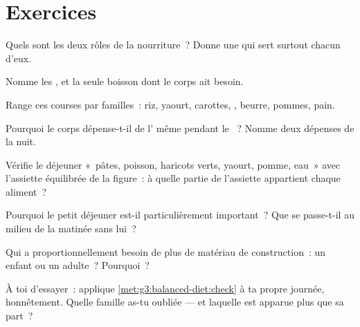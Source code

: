 \section{Exercices}

\begin{exercise}[$\star$]\label{exo:g3:balanced-diet:1}
Quels sont les deux rôles de la nourriture~? Donne une  qui sert surtout chacun d'eux.
\end{exercise}

\begin{exercise}[$\star$]\label{exo:g3:balanced-diet:2}
Nomme les , et la seule boisson dont le corps ait
besoin.
\end{exercise}

\begin{exercise}[$\star$]\label{exo:g3:balanced-diet:3}
Range ces courses par familles~: riz, yaourt, carottes, ,
beurre, pommes, pain.
\end{exercise}

\begin{exercise}[$\star$]\label{exo:g3:balanced-diet:4}
Pourquoi le corps dépense-t-il de l' même pendant le
~? Nomme deux dépenses de la nuit.
\end{exercise}

\begin{exercise}[$\star$]\label{exo:g3:balanced-diet:5}
Vérifie le déjeuner «~pâtes, poisson, haricots verts, yaourt, pomme,
eau~» avec l'assiette équilibrée de la figure~: à quelle partie de
l'assiette appartient chaque aliment~?
\end{exercise}

\begin{exercise}[$\star$]\label{exo:g3:balanced-diet:6}
Pourquoi le petit déjeuner est-il particulièrement important~? Que
se passe-t-il au milieu de la matinée sans lui~?
\end{exercise}

\begin{exercise}[$\star$]\label{exo:g3:balanced-diet:7}
Qui a proportionnellement besoin de plus de matériau de
construction~: un enfant ou un adulte~? Pourquoi~?
\end{exercise}

\begin{exercise}[$\star$]\label{exo:g3:balanced-diet:8}
À toi d'essayer~: applique \cref{met:g3:balanced-diet:check} à ta
propre journée, honnêtement. Quelle famille as-tu oubliée --- et
laquelle est apparue plus que sa part~?
\end{exercise}

